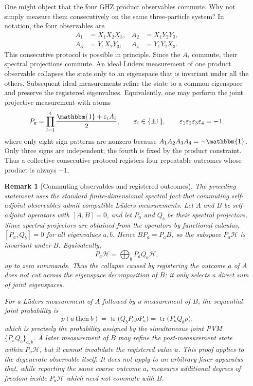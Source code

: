 \documentclass[aps,pra,twocolumn,superscriptaddress,nofootinbib]{revtex4-2}
\newtheorem{remark}{Remark}
\newcommand{\HH}{\mathcal{H}}
\newcommand{\tr}{\operatorname{tr}}
\newcommand{\id}{\mathbbm{1}}
\begin{document}
One might object that the four GHZ product observables commute.  Why not simply measure them consecutively on the same three-particle system?  In notation, the four observables are
\begin{align}
        A_1&=X_1X_2X_3,&
        A_2&=X_1Y_2Y_3,\nonumber\\
        A_3&=Y_1X_2Y_3,&
        A_4&=Y_1Y_2X_3 .
\end{align}
This consecutive protocol is possible in principle.  Since the $A_i$ commute, their spectral projections commute.  An ideal L\"uders measurement of one product observable collapses the state only to an eigenspace that is invariant under all the others.  Subsequent ideal measurements refine the state to a common eigenspace and preserve the registered eigenvalues.  Equivalently, one may perform the joint projective measurement with atoms
\begin{equation}
        P_{\boldsymbol\varepsilon}
        =\prod_{i=1}^4 \frac{\id+\varepsilon_i A_i}{2},
        \qquad
        \varepsilon_i\in\{\pm1\},
        \qquad
        \varepsilon_1\varepsilon_2\varepsilon_3\varepsilon_4=-1,
        \label{eq:ghz-joint-pvm}
\end{equation}
where only eight sign patterns are nonzero because $A_1A_2A_3A_4=-\id$.
Only three signs are independent; the fourth is fixed by the product
constraint.  Thus a collective consecutive protocol registers four repeatable
outcomes whose product is always $-1$.

\begin{remark}[Commuting observables and registered outcomes]\label{rem:commuting-lueders}
The preceding statement uses the standard finite-dimensional spectral fact that
commuting self-adjoint observables admit compatible L\"uders measurements.
Let $A$ and $B$ be self-adjoint operators with $[A,B]=0$, and let
$P_a$ and $Q_b$ be their spectral projectors.  Since spectral projectors
are obtained from the operators by functional calculus, $[P_a,Q_b]=0$ for
all eigenvalues $a,b$.  Hence $B P_a=P_aB$, so the subspace
$P_a\HH$ is invariant under $B$.  Equivalently,
\begin{equation}
        P_a\HH=\bigoplus_b P_aQ_b\HH,
        \label{eq:joint-eigenspace-refinement}
\end{equation}
up to zero summands.  Thus the collapse caused by registering the outcome
$a$ of $A$ does not cut across the eigenspace decomposition of $B$; it only
selects a direct sum of joint eigenspaces.

For a L\"uders measurement of $A$ followed by a measurement of $B$, the
sequential joint probability is
\[
        p(a\ \mathrm{then}\ b)
         =\tr\bigl(Q_b P_a\rho P_a\bigr)
         =\tr\bigl(P_aQ_b\rho\bigr).
\]
which is precisely the probability assigned by the simultaneous joint PVM
$\{P_aQ_b\}_{a,b}$.  A later measurement of $B$ may refine the post-measurement
state within $P_a\HH$, but it cannot invalidate the registered
value $a$.  This proof applies to the degenerate observable itself.  It
does not apply to an arbitrary finer apparatus that, while reporting the
same coarse outcome $a$, measures additional degrees of freedom inside
$P_a\HH$ which need not commute with $B$.
\end{remark}
\end{document}

